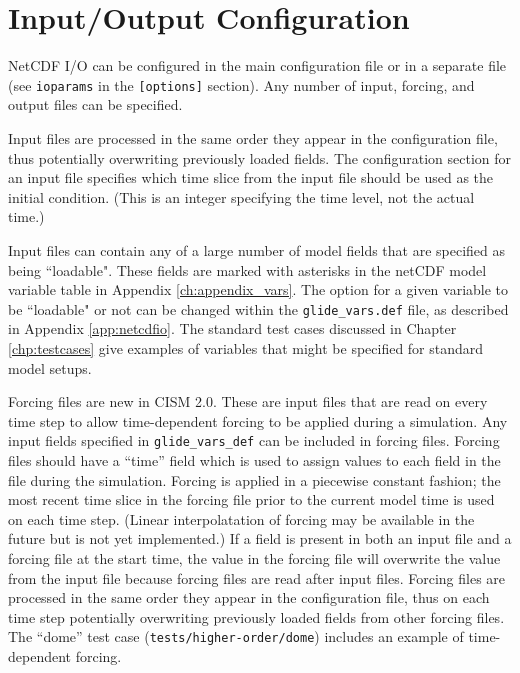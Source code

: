 \section{Input/Output Configuration}
\label{io-config}

NetCDF I/O can be configured in the main configuration file or in a separate file 
(see \texttt{ioparams} in the \texttt{[options]} section). 
Any number of input, forcing, and output files can be specified. 

Input files are processed in the same order they appear in the configuration file, 
thus potentially overwriting previously loaded fields.  The configuration section 
for an input file specifies which time slice from the input file should be used as
the initial condition.  (This is an integer specifying the time level, not
the actual time.)

Input files can contain any of a large number of model fields that are specified as being
``loadable". These fields are marked with asterisks in the netCDF model variable
table in Appendix \ref{ch:appendix_vars}. The option for a given variable to be ``loadable" 
or not can be changed within the \texttt{glide\_vars.def} file, as described in Appendix \ref{app:netcdfio}. 
The standard test cases discussed in Chapter \ref{chp:testcases} give examples
of variables that might be specified for standard model setups.    

Forcing files are new in CISM 2.0.  These are input files that are read on every 
time step to allow time-dependent
forcing to be applied during a simulation.  Any input fields specified in
\texttt{glide\_vars\_def} can be included
in forcing files.  Forcing files should have a ``time'' field which is used to 
assign values to each field in the file during the simulation.  Forcing is applied 
in a piecewise constant fashion; the most recent time slice in the forcing file prior
to the current model time is used on each time step.  (Linear interpolatation of
forcing may be available in the future but is not yet implemented.)
If a field is present in both an input file and a
forcing file at the start time, the value in the forcing file will overwrite the value
from the input file because forcing files are read after input files.
Forcing files are processed in the same order they appear in the configuration file, 
thus on each time step potentially overwriting previously loaded fields from other
forcing files.  The ``dome'' test case (\texttt{tests/higher-order/dome}) includes 
an example of time-dependent forcing.

